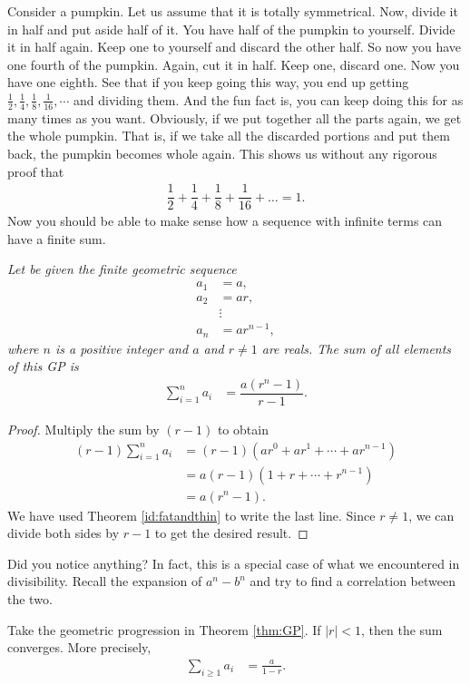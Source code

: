 \documentclass{subfile}
\begin{document}
	Consider a pumpkin. Let us assume that it is totally symmetrical. Now, divide it in half and put aside half of it. You have half of the pumpkin to yourself. Divide it in half again. Keep one to yourself and discard the other half. So now you have one fourth of the pumpkin. Again, cut it in half. Keep one, discard one. Now you have one eighth. See that if you keep going this way, you end up getting $\frac{1}{2},\frac{1}{4},\frac{1}{8},\frac{1}{16},\cdots$ and dividing them. And the fun fact is, you can keep doing this for as many times as you want. Obviously, if we put together all the parts again, we get the whole pumpkin. That is, if we take all the discarded portions and put them back, the pumpkin becomes whole again. This shows us without any rigorous proof that
		\begin{align*}
			\dfrac{1}{2}+\dfrac{1}{4}+\dfrac{1}{8}+\dfrac{1}{16}+\ldots=1.
		\end{align*}
	Now you should be able to make sense how a sequence with infinite terms can have a finite sum.
		\begin{theorem}\slshape\label{thm:GP}
			Let be given the finite geometric sequence
				\begin{align*}
					a_1 & = a,\\
					a_2 & = ar,\\
					& \vdots\\
					a_n & = ar^{n-1},
				\end{align*}
			where $n$ is a positive integer and $a$ and $r \neq 1$ are reals. The sum of all elements of this GP is
				\begin{align*}
					\sum_{i=1}^{n} a_i &= \dfrac{a \left(r^n-1\right)}{r-1}.
				\end{align*}
		\end{theorem}
		
		\begin{proof}
			Multiply the sum by $(r-1)$ to obtain
				\begin{align*}
					(r-1)\sum_{i=1}^{n} a_i &= (r-1)(ar^0 + ar^1 + \cdots + ar^{n-1})\\
											&= a(r-1)(1+r+ \cdots + r^{n-1})\\
											&= a(r^n -1).
				\end{align*}
			We have used Theorem \ref{id:fatandthin} to write the last line. Since $r \neq 1$, we can divide both sides by $r-1$ to get the desired result.
		\end{proof}
	Did you notice anything? In fact, this is a special case of what we encountered in divisibility. Recall the expansion of $a^n-b^n$ and try to find a correlation between the two.
		\begin{corollary}
			Take the geometric progression in Theorem \ref{thm:GP}. If $|r|<1$, then the sum converges. More precisely,
				\begin{align*}
					\sum_{i\geq1} a_i &= \frac{a}{1-r}.
				\end{align*}
		\end{corollary}
		
\end{document}
